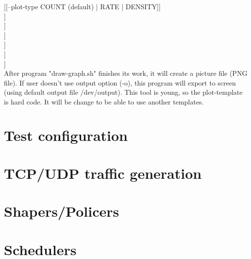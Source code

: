 \documentclass[a4paper]{article}
\begin{document}
\begin{enumerate}
\begin{flushleft}
{      [[--plot-type COUNT (default) | RATE | DENSITY]]\\
      [[--xrange 233:23221]]\\
      [[--yrange 282:2922]]\\
      [[--xlabel XYZ]]\\
      [[--ylabel ABC]]\\
      [[--xcol 2]]\\
      [[--ycol 1]]}\\
  After program "draw-graph.sh" finishes its work, it will create a picture file (PNG file). If user doesn't use output option (-o), this program will export to screen (using default output file /dev/output). This tool is young, so the plot-template is hard code. It will be change to be able to use another templates.\end{flushleft}
      \end{enumerate}  
  \section{Test configuration}
  \section{TCP/UDP traffic generation}
  \section{Shapers/Policers}
  \section{Schedulers}
\end{document}
